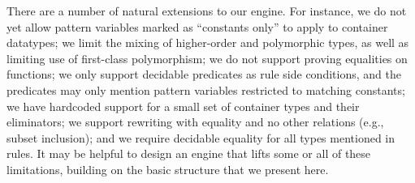 There are a number of natural extensions to our engine.
For instance, we do not yet allow pattern variables marked as ``constants only'' to apply to container datatypes; we limit the mixing of higher-order and polymorphic types, as well as limiting use of first-class polymorphism; we do not support proving equalities on functions; we only support decidable predicates as rule side conditions, and the predicates may only mention pattern variables restricted to matching constants; we have hardcoded support for a small set of container types and their eliminators; we support rewriting with equality and no other relations (e.g., subset inclusion); and we require decidable equality for all types mentioned in rules.
It may be helpful to design an engine that lifts some or all of these limitations, building on the basic structure that we present here.


